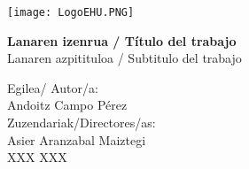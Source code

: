 \setlength{\parskip}{12pt}
\setlength{\parindent}{0cm}
\renewcommand{\arraystretch}{1.2}
\setcounter{secnumdepth}{4}

\geometry{top=2.5cm, bottom=2.5cm, left=2.5cm, right=2.5cm}




\renewcommand{\listtablename}{Índice de tablas}
\renewcommand{\tablename}{Tabla}


\begin{titlepage}
\hspace*{-3.5cm}
    \begin{minipage}{\textwidth}
        \vspace{-2.5cm}
        \begin{center}
    

            \texttt{[image: LogoEHU.PNG]}
        \end{center}
    \end{minipage}

\vspace{1cm}

\hspace{-3.1cm}
\noindent{}


\vspace{0.8cm}

\noindent\hspace*{-2.5cm}%
\colorbox{light-gray}{\begin{minipage}{\paperwidth}%

    \vspace{1cm}

    \color{RoyalBlue}
    \centering\Large\textbf{ Lanaren izenrua / Título del trabajo}
    \\
    \centering\textmd{ Lanaren azpitituloa / Subtitulo del trabajo}


    \vspace{6cm}\mbox{}
  \end{minipage}
}

\begin{flushright}
 Egilea/ Autor/a:
\\
Andoitz Campo Pérez
\\
Zuzendariak/Directores/as:
\\
Asier Aranzabal Maiztegi
\\
XXX XXX                      
\\
\end{flushright}


\end{titlepage}
